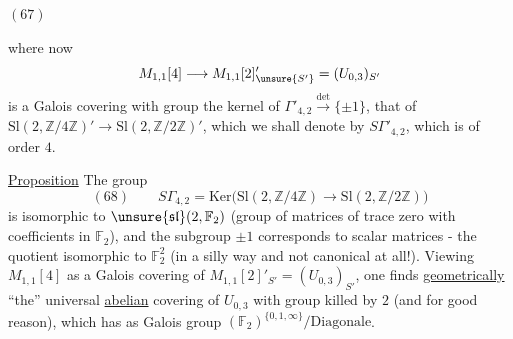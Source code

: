 
\begin{samepage}
\((67)\)
\end{samepage}

where now
\[
M_{1,1}[4]\longrightarrow M_{1,1}[2]'_{\unsure{S'}}
=(U_{0,3})_{S'}
\]
is a Galois covering with group the kernel of
$\Gamma'_{4,2}\xrightarrow{\det}\{\pm1\}$,
 that of
$\mathrm{Sl}(2,\mathbb Z/4\mathbb Z)'
\longrightarrow\mathrm{Sl}(2,\mathbb Z/2\mathbb Z)'$,
which we shall denote by $S\Gamma'_{4,2}$, which is of order $4$.

\uline{Proposition} The group
\[
(68)\qquad
S\Gamma_{4,2}
=
\mathrm{Ker}\bigl(
\mathrm{Sl}(2,\mathbb Z/4\mathbb Z)
\longrightarrow
\mathrm{Sl}(2,\mathbb Z/2\mathbb Z)
\bigr)
\]
is isomorphic to 
$\unsure{\mathfrak{sl}}(2,\mathbb F_2)$
(group of matrices of trace zero with coefficients in $\mathbb F_2$),
and the subgroup $\pm1$ corresponds to scalar matrices -
the quotient 
isomorphic to  $\mathbb F_2^2$
(in a silly way and not canonical at all!).
Viewing $M_{1,1}[4]$ as a Galois covering of
$M_{1,1}[2]'_{S'}=(U_{0,3})_{S'}$, one finds
\uline{geometrically} ``the'' universal \uline{abelian} covering of
$U_{0,3}$ with group killed by $2$ (and for good reason), which has as
Galois group $(\mathbb F_2)^{\{0,1,\infty\}}/\mathrm{Diagonale}$.

